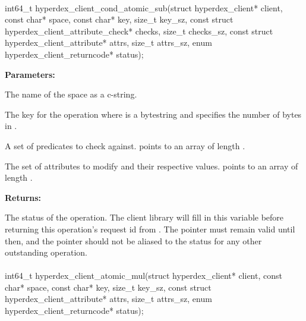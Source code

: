 \paragraph{}
\label{api:c:cond_atomic_sub}
\begin{ccode}
int64_t hyperdex_client_cond_atomic_sub(struct hyperdex_client* client,
        const char* space,
        const char* key, size_t key_sz,
        const struct hyperdex_client_attribute_check* checks, size_t checks_sz,
        const struct hyperdex_client_attribute* attrs, size_t attrs_sz,
        enum hyperdex_client_returncode* status);
\end{ccode}
\funcdesc 

\noindent\textbf{Parameters:}
\begin{description}[labelindent=\widthof{{\code{checks}, \code{checks\_sz}}},leftmargin=*,noitemsep,nolistsep,align=right]
\item[\code{space}] The name of the space as a c-string.
\item[\code{key}, \code{key\_sz}] The key for the operation where  is a bytestring and  specifies the number of bytes in .
\item[\code{checks}, \code{checks\_sz}] A set of predicates to check against.   points to an array of length .
\item[\code{attrs}, \code{attrs\_sz}] The set of attributes to modify and their respective values.   points to an array of length .
\end{description}

\noindent\textbf{Returns:}
\begin{description}[labelindent=\widthof{{\code{status}}},leftmargin=*,noitemsep,nolistsep,align=right]
\item[\code{status}] The status of the operation.  The client library will fill in this variable before returning this operation's request id from .  The pointer must remain valid until then, and the pointer should not be aliased to the status for any other outstanding operation.
\end{description}

\paragraph{}
\label{api:c:atomic_mul}
\begin{ccode}
int64_t hyperdex_client_atomic_mul(struct hyperdex_client* client,
        const char* space,
        const char* key, size_t key_sz,
        const struct hyperdex_client_attribute* attrs, size_t attrs_sz,
        enum hyperdex_client_returncode* status);
\end{ccode}
\funcdesc 


